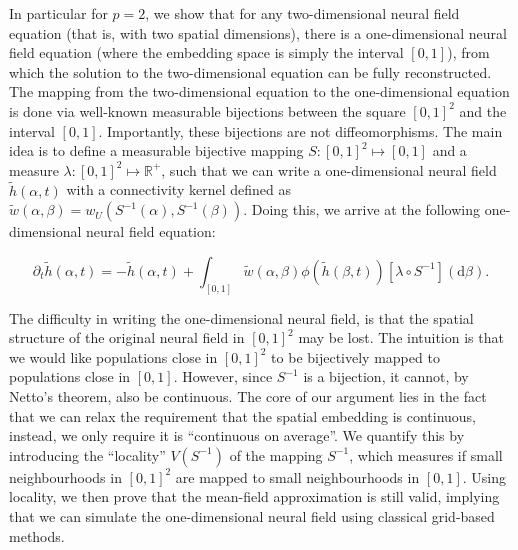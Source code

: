 \documentclass[10pt,letterpaper]{article}
\def\d{\mathrm d}
\begin{document}

In particular for $p=2$, we show that for any two-dimensional neural field equation (that is, with two spatial dimensions), there is a one-dimensional neural field equation (where the embedding space is simply the interval $[0,1]$), from which the solution to the two-dimensional equation can be fully reconstructed. The mapping from the two-dimensional equation to the one-dimensional equation is done via well-known measurable bijections between the square $[0,1]^2$ and the interval $[0,1]$. Importantly, these bijections are not diffeomorphisms.
The main idea is to define a measurable bijective mapping $S : [0,1]^2 \mapsto [0,1]$ and a measure $\lambda : [0,1]^2 \mapsto \mathbb{R}^+$, such that we can write a one-dimensional neural field	$\tilde h(\alpha, t)$ with a connectivity kernel defined as $\tilde w(\alpha, \beta) = w_U(S^{-1}(\alpha), S^{-1}(\beta))$. Doing this, we arrive at the following one-dimensional neural field equation: 

\begin{equation} \label{eq:nf-in-01}
\partial_t \tilde h(\alpha, t) = -\tilde h(\alpha, t) + \int_{[0,1]} \tilde w(\alpha, \beta) \phi(\tilde h(\beta, t)) \left[\lambda \circ S^{-1}\right](\d \beta).
\end{equation}

The difficulty in writing the one-dimensional neural field, is that the spatial structure of the original neural field in $[0,1]^2$ may be lost. The intuition is that we would like populations close in $[0,1]^2$ to be bijectively mapped to populations close in $[0,1]$. However, since $S^{-1}$ is a bijection, it cannot, by Netto's theorem, also be continuous. The core of our argument lies in the fact that we can relax the requirement that the spatial embedding is continuous, instead, we only require it is ``continuous on average''. We quantify this by introducing the ``locality'' $V(S^{-1})$ of the mapping $S^{-1}$, which measures if small neighbourhoods in $[0,1]^2$ are mapped to small neighbourhoods in $[0,1]$. Using locality, we then prove that the mean-field approximation is still valid, implying that we can simulate the one-dimensional neural field using classical grid-based methods.
\end{document}
